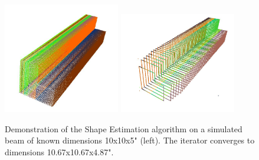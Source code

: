 \documentclass[12pt]{drexelthesis}
\begin{document}
\begin{figure}[!ht]
	\centering
		\includegraphics[width=2in]{cross-section-estimation/noiselessbeam(10x10x5).JPG}
		\includegraphics[width=2in]{cross-section-estimation/newtonraphsonconvergence(10x10x5).JPG}
	\caption[Demonstration of the Informed Shape Estimation algorithm on a simulated point cloud.]{\centering Demonstration of the Shape Estimation algorithm on a simulated beam of known dimensions 10x10x5" (left). The iterator converges to dimensions 10.67x10.67x4.87".}
\end{figure}





\pagebreak
{}
\begin{spacing}{1.0}


\end{spacing}

\newpage
\thispagestyle{empty}

                                                                                                
\end{document}
